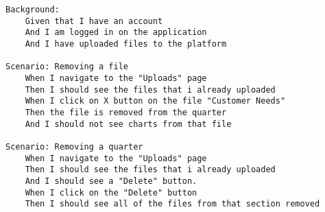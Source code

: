 \begin{lstlisting}[language=Gherkin]
    Background:  
	Given that I have an account
	And I am logged in on the application
	And I have uploaded files to the platform
 
Scenario: Removing a file
	When I navigate to the "Uploads" page  
	Then I should see the files that i already uploaded
	When I click on X button on the file "Customer Needs"
	Then the file is removed from the quarter
	And I should not see charts from that file
	
Scenario: Removing a quarter
	When I navigate to the "Uploads" page  
	Then I should see the files that i already uploaded
	And I should see a "Delete" button.
	When I click on the "Delete" button
	Then I should see all of the files from that section removed 
\end{lstlisting}

